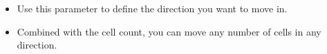 \begin{itemize}
\item Use this parameter to define the direction you want to move in. 
\item Combined with the cell count, you can move any number of cells in any direction.
\end{itemize}
